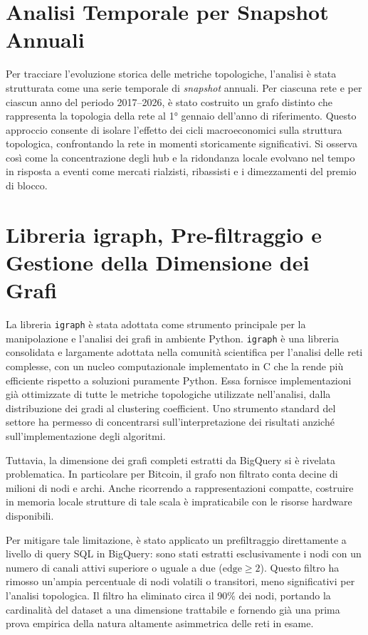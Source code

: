 \documentclass[12pt,a4paper,oneside]{book}
\begin{document}
\section{Analisi Temporale per Snapshot Annuali}
Per tracciare l'evoluzione storica delle metriche topologiche, l'analisi è stata strutturata come una serie temporale di \textit{snapshot} annuali. Per ciascuna rete e per ciascun anno del periodo 2017--2026, è stato costruito un grafo distinto che rappresenta la topologia della rete al 1° gennaio dell'anno di riferimento. Questo approccio consente di isolare l'effetto dei cicli macroeconomici sulla struttura topologica, confrontando la rete in momenti storicamente significativi. Si osserva così come la concentrazione degli hub e la ridondanza locale evolvano nel tempo in risposta a eventi come mercati rialzisti, ribassisti e i dimezzamenti del premio di blocco.

\section{Libreria igraph, Pre-filtraggio e Gestione della Dimensione dei Grafi}
La libreria \texttt{igraph} \cite{igraph} è stata adottata come strumento principale per la manipolazione e l'analisi dei grafi in ambiente Python. \texttt{igraph} è una libreria consolidata e largamente adottata nella comunità scientifica per l'analisi delle reti complesse, con un nucleo computazionale implementato in C che la rende più efficiente rispetto a soluzioni puramente Python. Essa fornisce implementazioni già ottimizzate di tutte le metriche topologiche utilizzate nell'analisi, dalla distribuzione dei gradi al clustering coefficient. Uno strumento standard del settore ha permesso di concentrarsi sull'interpretazione dei risultati anziché sull'implementazione degli algoritmi.

Tuttavia, la dimensione dei grafi completi estratti da BigQuery si è rivelata problematica. In particolare per Bitcoin, il grafo non filtrato conta decine di milioni di nodi e archi. Anche ricorrendo a rappresentazioni compatte, costruire in memoria locale strutture di tale scala è impraticabile con le risorse hardware disponibili.

Per mitigare tale limitazione, è stato applicato un prefiltraggio direttamente a livello di query SQL in BigQuery: sono stati estratti esclusivamente i nodi con un numero di canali attivi superiore o uguale a due ($\text{edge} \ge 2$). Questo filtro ha rimosso un'ampia percentuale di nodi volatili o transitori, meno significativi per l'analisi topologica. Il filtro ha eliminato circa il 90\% dei nodi, portando la cardinalità del dataset a una dimensione trattabile e fornendo già una prima prova empirica della natura altamente asimmetrica delle reti in esame.
\end{document}

